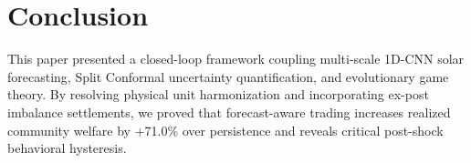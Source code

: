 \documentclass[conference]{IEEEtran}
\begin{document}
\section{Conclusion}
This paper presented a closed-loop framework coupling multi-scale 1D-CNN solar forecasting, Split Conformal uncertainty quantification, and evolutionary game theory. By resolving physical unit harmonization and incorporating ex-post imbalance settlements, we proved that forecast-aware trading increases realized community welfare by +71.0\% over persistence and reveals critical post-shock behavioral hysteresis.



\end{document}
